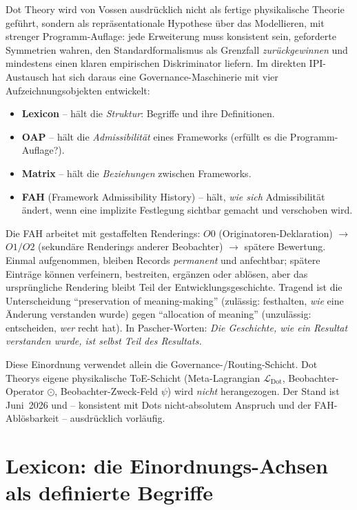 Dot Theory wird von Vossen ausdrücklich nicht als fertige physikalische Theorie geführt, sondern als
repräsentationale Hypothese über das Modellieren, mit strenger Programm-Auflage: jede Erweiterung muss
konsistent sein, geforderte Symmetrien wahren, den Standardformalismus als Grenzfall \emph{zurückgewinnen}
und mindestens einen klaren empirischen Diskriminator liefern. Im direkten IPI-Austausch hat sich daraus
eine Governance-Maschinerie mit vier Aufzeichnungsobjekten entwickelt:

\begin{itemize}
\item \textbf{Lexicon} -- hält die \emph{Struktur}: Begriffe und ihre Definitionen.
\item \textbf{OAP} -- hält die \emph{Admissibilität} eines Frameworks (erfüllt es die Programm-Auflage?).
\item \textbf{Matrix} -- hält die \emph{Beziehungen} zwischen Frameworks.
\item \textbf{FAH} (Framework Admissibility History) -- hält, \emph{wie sich} Admissibilität ändert,
wenn eine implizite Festlegung sichtbar gemacht und verschoben wird.
\end{itemize}

Die FAH arbeitet mit gestaffelten Renderings: $O0$ (Originatoren-Deklaration) $\to$ $O1/O2$ (sekundäre
Renderings anderer Beobachter) $\to$ spätere Bewertung. Einmal aufgenommen, bleiben Records
\emph{permanent} und anfechtbar; spätere Einträge können verfeinern, bestreiten, ergänzen oder ablösen,
aber das ursprüngliche Rendering bleibt Teil der Entwicklungsgeschichte. Tragend ist die Unterscheidung
\enquote{preservation of meaning-making} (zulässig: festhalten, \emph{wie} eine Änderung verstanden wurde)
gegen \enquote{allocation of meaning} (unzulässig: entscheiden, \emph{wer} recht hat). In Pascher-Worten:
\emph{Die Geschichte, wie ein Resultat verstanden wurde, ist selbst Teil des Resultats.}

Diese Einordnung verwendet allein die Governance-/Routing-Schicht. Dot Theorys eigene physikalische
ToE-Schicht (Meta-Lagrangian $\mathcal{L}_{\text{Dot}}$, Beobachter-Operator $\odot$, Beobachter-Zweck-Feld
$\psi$) wird \emph{nicht} herangezogen. Der Stand ist Juni~2026 und -- konsistent mit Dots nicht-absolutem
Anspruch und der FAH-Ablösbarkeit -- ausdrücklich vorläufig.

\section{Lexicon: die Einordnungs-Achsen als definierte Begriffe}

